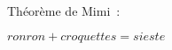 \documentclass[11pt]{article}
\begin{document}
    Théorème de Mimi~\cite{mimi1}:

$ ronron + croquettes = sieste $

    
    
\end{document}
